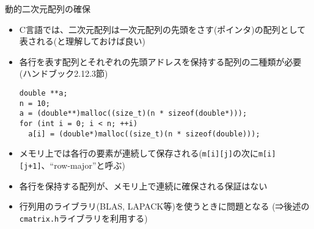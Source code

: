 \begin{frame}[t,fragile]{動的二次元配列の確保}
  \begin{itemize}
    \item C言語では、二次元配列は一次元配列の先頭をさす(ポインタ)の配列として表される(と理解しておけば良い)
    \item 各行を表す配列とそれぞれの先頭アドレスを保持する配列の二種類が必要 (ハンドブック2.12.3節)
    \begin{lstlisting}
double **a;
n = 10;  
a = (double**)malloc((size_t)(n * sizeof(double*)));
for (int i = 0; i < n; ++i)
  a[i] = (double*)malloc((size_t)(n * sizeof(double)));
    \end{lstlisting}
  \item メモリ上では各行の要素が連続して保存される(\verb+m[i][j]+の次に\verb!m[i][j+1]!、``row-major''と呼ぶ)
  \item 各行を保持する配列が、メモリ上で連続に確保される保証はない
  \item 行列用のライブラリ(BLAS, LAPACK等)を使うときに問題となる (⇒後述の\verb+cmatrix.h+ライブラリを利用する)
  \end{itemize}
\end{frame}
